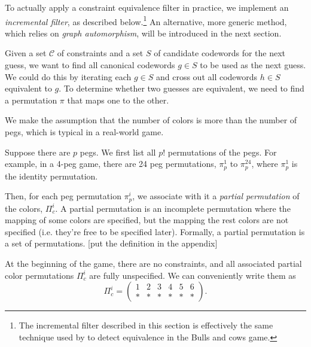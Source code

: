 To actually apply a constraint equivalence filter in practice, we implement an \emph{incremental filter}, as described below.\footnote{The incremental filter described in this section is effectively the same technique used by \cite{francis10} to detect equivalence in the Bulls and cows game.}
An alternative, more generic method, which relies on \emph{graph automorphism}, will be introduced in the next section.

Given a set $\mathcal{C}$ of constraints and a set $S$ of candidate codewords for the next guess, we want to find all canonical codewords $g \in S$ to be used as the next guess. We could do this by iterating each $g \in S$ and cross out all codewords $h \in S$ equivalent to $g$. To determine whether two guesses are equivalent, we need to find a permutation $\pi$ that maps one to the other.

We make the assumption that the number of colors is more than the number of pegs, which is typical in a real-world game.

Suppose there are $p$ pegs. We first list all $p!$ permutations of the pegs. For example, in a 4-peg game, there are 24 peg permutations, $\pi_p^1$ to $\pi_p^{24}$, where $\pi_p^1$ is the identity permutation.

Then, for each peg permutation $\pi_p^i$, we associate with it a \emph{partial permutation} of the colors, $\Pi_c^i$. A partial permutation is an incomplete permutation where the mapping of some colors are specified, but the mapping the rest colors are not specified (i.e. they're free to be specified later). Formally, a partial permutation is a set of permutations. [put the definition in the appendix]

At the beginning of the game, there are no constraints, and all associated partial color permutations $\Pi_c^i$ are fully unspecified. We can conveniently write them as
\[
\Pi_c^i = 
\begin{pmatrix}
1 & 2 & 3 & 4 & 5 & 6 \\
* & * & * & * & * & * 
\end{pmatrix} .
\]

